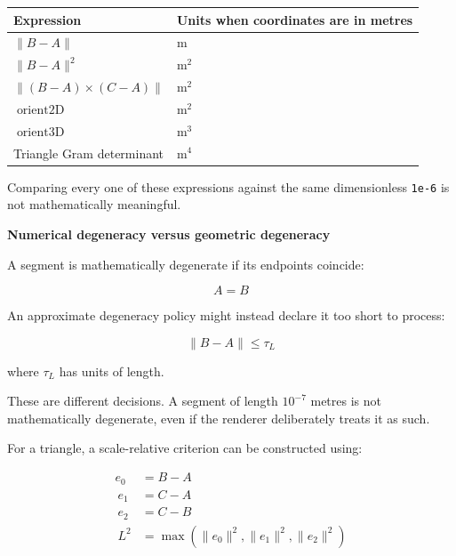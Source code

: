 {\def\LTcaptype{none} %
\begin{longtable}[]{@{}
  >{\raggedright\arraybackslash}p{}
  >{\raggedright\arraybackslash}p{}@{}}
\toprule\noalign{}
\begin{minipage}[b]{\linewidth}\raggedright
Expression
\end{minipage} & \begin{minipage}[b]{\linewidth}\raggedright
Units when coordinates are in metres
\end{minipage} \\
\midrule\noalign{}
\endhead
\bottomrule\noalign{}
\endlastfoot
\(\|B-A\|\) & \(\mathrm m\) \\
\(\|B-A\|^2\) & \(\mathrm m^2\) \\
\(\|(B-A)\times(C-A)\|\) & \(\mathrm m^2\) \\
\(\operatorname{orient2D}\) & \(\mathrm m^2\) \\
\(\operatorname{orient3D}\) & \(\mathrm m^3\) \\
Triangle Gram determinant & \(\mathrm m^4\) \\
\end{longtable}
}

Comparing every one of these expressions against the same dimensionless \texttt{1e-6} is not mathematically meaningful.

\textbf{Numerical degeneracy versus geometric degeneracy}

A segment is mathematically degenerate if its endpoints coincide:

\[
A=B
\]

An approximate degeneracy policy might instead declare it too short to process:

\[
\|B-A\|\le \tau_L
\]

where \(\tau_L\) has units of length.

These are different decisions. A segment of length \(10^{-7}\) metres is not mathematically degenerate, even if the renderer deliberately treats it as such.

For a triangle, a scale-relative criterion can be constructed using:

\[
\begin{aligned} e_0&=B-A\\\ e_1&=C-A\\\ e_2&=C-B\\\ L^2&=\max(\|e_0\|^2,\|e_1\|^2,\|e_2\|^2) \end{aligned}
\]

